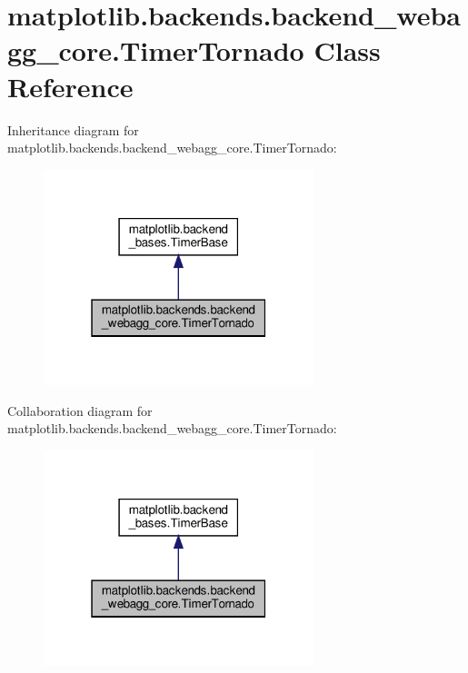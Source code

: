 \hypertarget{classmatplotlib_1_1backends_1_1backend__webagg__core_1_1TimerTornado}{}\section{matplotlib.\+backends.\+backend\+\_\+webagg\+\_\+core.\+Timer\+Tornado Class Reference}
\label{classmatplotlib_1_1backends_1_1backend__webagg__core_1_1TimerTornado}


Inheritance diagram for matplotlib.\+backends.\+backend\+\_\+webagg\+\_\+core.\+Timer\+Tornado\+:
\nopagebreak
\begin{figure}[H]
\begin{center}
\leavevmode
\includegraphics[width=223pt]{classmatplotlib_1_1backends_1_1backend__webagg__core_1_1TimerTornado__inherit__graph}
\end{center}
\end{figure}


Collaboration diagram for matplotlib.\+backends.\+backend\+\_\+webagg\+\_\+core.\+Timer\+Tornado\+:
\nopagebreak
\begin{figure}[H]
\begin{center}
\leavevmode
\includegraphics[width=223pt]{classmatplotlib_1_1backends_1_1backend__webagg__core_1_1TimerTornado__coll__graph}
\end{center}
\end{figure}
